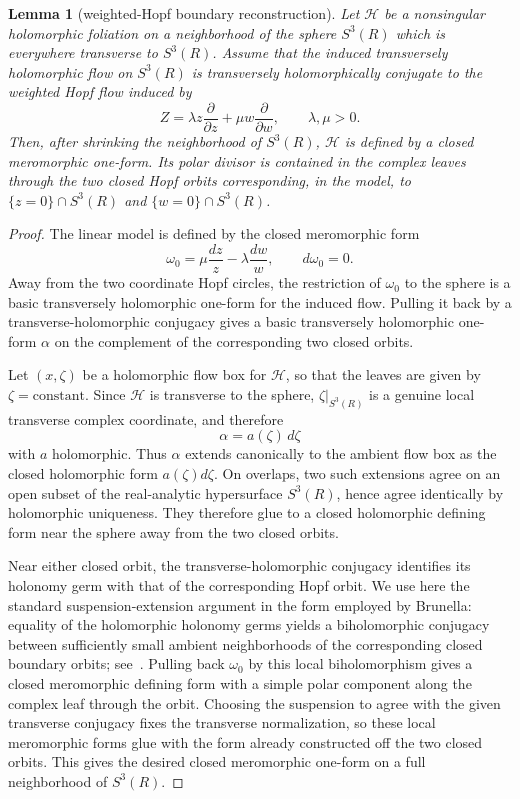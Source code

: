 \documentclass[11pt,reqno]{article}
\newtheorem{lemma}[theorem]{Lemma}
\theoremstyle{remark}
\newcommand{\pd}{\partial}
\begin{document}
\begin{lemma}[weighted-Hopf boundary reconstruction]\label{lem:hopf-boundary}
Let $\mathcal H$ be a nonsingular holomorphic foliation on a neighborhood of the sphere $S^3(R)$ which is everywhere transverse to $S^3(R)$. Assume that the induced transversely holomorphic flow on $S^3(R)$ is transversely holomorphically conjugate to the weighted Hopf flow induced by
\[
 Z=\lambda z\frac{\pd}{\pd z}+\mu w\frac{\pd}{\pd w},
 \qquad \lambda,\mu>0.
\]
Then, after shrinking the neighborhood of $S^3(R)$, $\mathcal H$ is defined by a closed meromorphic one-form. Its polar divisor is contained in the complex leaves through the two closed Hopf orbits corresponding, in the model, to $\{z=0\}\cap S^3(R)$ and $\{w=0\}\cap S^3(R)$.
\end{lemma}

\begin{proof}
The linear model is defined by the closed meromorphic form
\[
 \omega_0=\mu\frac{dz}{z}-\lambda\frac{dw}{w},
 \qquad d\omega_0=0.
\]
Away from the two coordinate Hopf circles, the restriction of $\omega_0$ to the sphere is a basic transversely holomorphic one-form for the induced flow. Pulling it back by a transverse-holomorphic conjugacy gives a basic transversely holomorphic one-form $\alpha$ on the complement of the corresponding two closed orbits.

Let $(x,\zeta)$ be a holomorphic flow box for $\mathcal H$, so that the leaves are given by $\zeta=\mathrm{constant}$. Since $\mathcal H$ is transverse to the sphere, $\zeta|_{S^3(R)}$ is a genuine local transverse complex coordinate, and therefore
\[
 \alpha=a(\zeta)\,d\zeta
\]
with $a$ holomorphic. Thus $\alpha$ extends canonically to the ambient flow box as the closed holomorphic form $a(\zeta)d\zeta$. On overlaps, two such extensions agree on an open subset of the real-analytic hypersurface $S^3(R)$, hence agree identically by holomorphic uniqueness. They therefore glue to a closed holomorphic defining form near the sphere away from the two closed orbits.

Near either closed orbit, the transverse-holomorphic conjugacy identifies its holonomy germ with that of the corresponding Hopf orbit. We use here the standard suspension-extension argument in the form employed by Brunella: equality of the holomorphic holonomy germs yields a biholomorphic conjugacy between sufficiently small ambient neighborhoods of the corresponding closed boundary orbits; see~\cite[pp.~124--125]{Brunella1995}. Pulling back $\omega_0$ by this local biholomorphism gives a closed meromorphic defining form with a simple polar component along the complex leaf through the orbit. Choosing the suspension to agree with the given transverse conjugacy fixes the transverse normalization, so these local meromorphic forms glue with the form already constructed off the two closed orbits. This gives the desired closed meromorphic one-form on a full neighborhood of $S^3(R)$.
\end{proof}
\end{document}

